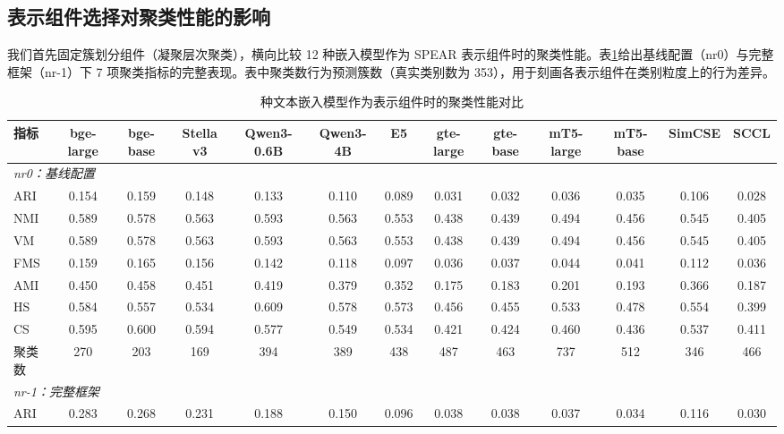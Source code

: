 \documentclass[10.5pt,compsoc,UTF8]{CjC}
\theoremstyle{mystyle}
\begin{document}
{\heiti \subsection{表示组件选择对聚类性能的影响}}

我们首先固定簇划分组件（凝聚层次聚类），横向比较 12 种嵌入模型作为 SPEAR 表示组件时的聚类性能。表\ref{tab:rep_quality}给出基线配置（nr0）与完整框架（nr-1）下 7 项聚类指标的完整表现。表中聚类数行为预测簇数（真实类别数为 353），用于刻画各表示组件在类别粒度上的行为差异。

\begin{table}[htbp]
\centering
\footnotesize
\caption{ 种文本嵌入模型作为表示组件时的聚类性能对比}
\label{tab:rep_quality}
\vspace{1.5mm}
\begin{adjustbox}{width=\textwidth}
\begin{tabular}{lcccccccccccc}
\toprule
指标 & bge-large & bge-base & Stella v3 & Qwen3-0.6B & Qwen3-4B & E5 & gte-large & gte-base & mT5-large & mT5-base & SimCSE & SCCL \\
\midrule
\multicolumn{13}{l}{\emph{nr0：基线配置}} \\
ARI & 0.154 & 0.159 & 0.148 & 0.133 & 0.110 & 0.089 & 0.031 & 0.032 & 0.036 & 0.035 & 0.106 & 0.028 \\
NMI & 0.589 & 0.578 & 0.563 & 0.593 & 0.563 & 0.553 & 0.438 & 0.439 & 0.494 & 0.456 & 0.545 & 0.405 \\
VM & 0.589 & 0.578 & 0.563 & 0.593 & 0.563 & 0.553 & 0.438 & 0.439 & 0.494 & 0.456 & 0.545 & 0.405 \\
FMS & 0.159 & 0.165 & 0.156 & 0.142 & 0.118 & 0.097 & 0.036 & 0.037 & 0.044 & 0.041 & 0.112 & 0.036 \\
AMI & 0.450 & 0.458 & 0.451 & 0.419 & 0.379 & 0.352 & 0.175 & 0.183 & 0.201 & 0.193 & 0.366 & 0.187 \\
HS & 0.584 & 0.557 & 0.534 & 0.609 & 0.578 & 0.573 & 0.456 & 0.455 & 0.533 & 0.478 & 0.554 & 0.399 \\
CS & 0.595 & 0.600 & 0.594 & 0.577 & 0.549 & 0.534 & 0.421 & 0.424 & 0.460 & 0.436 & 0.537 & 0.411 \\
聚类数 & 270 & 203 & 169 & 394 & 389 & 438 & 487 & 463 & 737 & 512 & 346 & 466 \\
\midrule
\multicolumn{13}{l}{\emph{nr-1：完整框架}} \\
ARI & 0.283 & 0.268 & 0.231 & 0.188 & 0.150 & 0.096 & 0.038 & 0.038 & 0.037 & 0.034 & 0.116 & 0.030 \\

\end{tabular}
\end{adjustbox}
\end{table}
\end{document}
